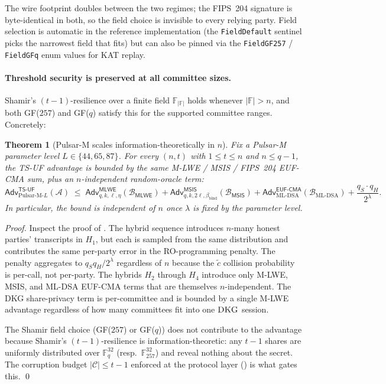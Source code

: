 \documentclass[11pt,a4paper]{article}
\newtheorem{theorem}{Theorem}
\theoremstyle{definition}
\theoremstyle{remark}
\newcommand{\Adv}{\mathsf{Adv}}
\newcommand{\MLWE}{\mathsf{MLWE}}
\newcommand{\MSIS}{\mathsf{MSIS}}
\newcommand{\DKG}{\textsc{DKG}}
\begin{document}
The wire footprint doubles between the two regimes; the FIPS~204
signature is byte-identical in both, so the field choice is
invisible to every relying party. Field selection is automatic in
the reference implementation (the \texttt{FieldDefault} sentinel
picks the narrowest field that fits) but can also be pinned via the
\texttt{FieldGF257} / \texttt{FieldGFq} enum values for KAT replay.

\paragraph{Threshold security is preserved at all committee sizes.}
Shamir's $(t-1)$-resilience over a finite field $\mathbb{F}_{|\mathbb{F}|}$
holds whenever $|\mathbb{F}| > n$, and both GF($257$) and GF($q$)
satisfy this for the supported committee ranges. Concretely:

\begin{theorem}[Pulsar-M scales information-theoretically in $n$]
\label{thm:pulsar-m-scales-it}
Fix a Pulsar-M parameter level $L \in \{44, 65, 87\}$. For every
$(n, t)$ with $1 \le t \le n$ and $n \le q - 1$, the TS-UF advantage
 is bounded by the same M-LWE / MSIS / FIPS~204
EUF-CMA sum, plus an $n$-independent random-oracle term:
\[
\Adv^{\mathsf{TS\textsf{-}UF}}_{\mathrm{Pulsar\text{-}M}\text{-}L}(\mathcal{A})
\;\le\;
\Adv^{\MLWE}_{q, k, \ell, \eta}(\mathcal{B}_{\MLWE})
+ \Adv^{\MSIS}_{q, k, 2\ell, \beta_{\mathrm{bind}}}(\mathcal{B}_{\MSIS})
+ \Adv^{\mathsf{EUF\textsf{-}CMA}}_{\mathrm{ML\text{-}DSA}}(\mathcal{B}_{\mathrm{ML\text{-}DSA}})
+ \frac{q_S \cdot q_H}{2^\lambda}.
\]
In particular, the bound is independent of $n$ once $\lambda$ is
fixed by the parameter level.
\end{theorem}

\begin{proof}
Inspect the proof of . The hybrid sequence introduces
$n$-many honest parties' transcripts in $H_1$, but each is sampled
from the same distribution and contributes the same per-party error
in the RO-programming penalty. The penalty aggregates to
$q_S q_H / 2^\lambda$ regardless of $n$ because the $\tilde c$
collision probability is per-call, not per-party. The hybrids $H_2$
through $H_4$ introduce only M-LWE, MSIS, and ML-DSA EUF-CMA terms
that are themselves $n$-independent. The DKG share-privacy term
 is per-committee and is bounded by a single
M-LWE advantage regardless of how many committees fit into one
$\DKG$ session.

The Shamir field choice (GF($257$) or GF($q$)) does not contribute
to the advantage because Shamir's $(t-1)$-resilience is
information-theoretic: any $t-1$ shares are uniformly distributed
over $\mathbb{F}_q^{32}$ (resp.\ $\mathbb{F}_{257}^{32}$) and reveal
nothing about the secret. The corruption budget $|\mathcal{C}| \le
t-1$ enforced at the protocol layer () is what gates
this. \qed
\end{proof}
\end{document}

